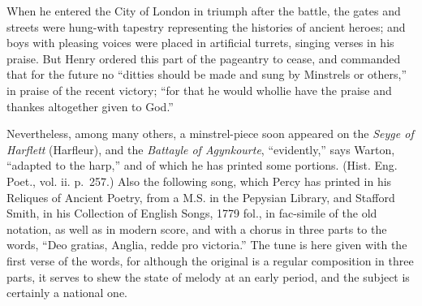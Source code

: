 When he entered the City of London in triumph after the battle, the gates and
streets were hung-with tapestry representing the histories of ancient heroes; and
boys with pleasing voices were placed in artificial turrets, singing verses in his
praise. But Henry ordered this part of the pageantry to cease, and commanded
that for the future no “ditties should be made and sung by Minstrels or others,”
in praise of the recent victory; “for that he would whollie have the praise
and thankes altogether given to God.”

Nevertheless, among many others, a minstrel-piece soon appeared on the
\textit{Seyge of Harflett} (Harfleur), and the \textit{Battayle of Agynkourte}, “evidently,” says
Warton, “adapted to the harp,” and of 
which he has printed some portions. 
\pagebreak
(Hist. Eng. Poet., vol. ii. p.~257.) Also the following song, which Percy has
printed in his Reliques of Ancient Poetry, from a M.S. in the Pepysian Library,
and Stafford Smith, in his Collection of English Songs, 1779 fol., in fac-simile of
the old notation, as well as in modern score, and with a chorus in three parts to
the words, “Deo gratias, Anglia, redde pro victoria.” The tune is here given
with the first verse of the words, %
for although the original is a regular composition
in three parts, it serves to shew the state of melody at an early period, and
the subject is certainly a national one.

\renewcommand\rectoheader{henry v.}




